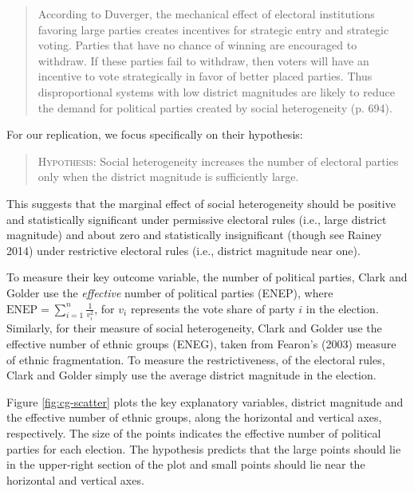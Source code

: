 \documentclass[12pt]{article}
\begin{document}
\begin{quote}
According to Duverger, the mechanical effect of electoral institutions favoring large parties creates incentives for strategic entry and strategic voting. Parties that have no chance of winning are encouraged to withdraw. If these parties fail to withdraw, then voters will have an incentive to vote strategically in favor of better placed parties. Thus disproportional systems with low district magnitudes are likely to reduce the demand for political parties created by social heterogeneity (p. 694).
\end{quote}

For our replication, we focus specifically on their hypothesis:
\begin{quote}
\textsc{Hypothesis:} Social heterogeneity increases the number of electoral parties only when the district magnitude is sufficiently large.
\end{quote}

This suggests that the marginal effect of social heterogeneity should be positive and statistically significant under permissive electoral rules (i.e., large district magnitude) and about zero and statistically insignificant (though see Rainey 2014) under restrictive electoral rules (i.e., district magnitude near one).

To measure their key outcome variable, the number of political parties, Clark and Golder use the \textit{effective} number of political parties (ENEP), where $\text{ENEP} = \sum_{i = 1}^n\frac{1}{v_i^2}$, for $v_i$ represents the vote share of party $i$ in the election. Similarly, for their measure of social heterogeneity, Clark and Golder use the effective number of ethnic groups (ENEG), taken from Fearon's (2003) measure of ethnic fragmentation. To measure the restrictiveness, of the electoral rules, Clark and Golder simply use the average district magnitude in the election. 

Figure \ref{fig:cg-scatter} plots the key explanatory variables, district magnitude and the effective number of ethnic groups, along the horizontal and vertical axes, respectively. The size of the points indicates the effective number of political parties for each election. The hypothesis predicts that the large points should lie in the upper-right section of the plot and small points should lie near the horizontal and vertical axes.
\end{document}
